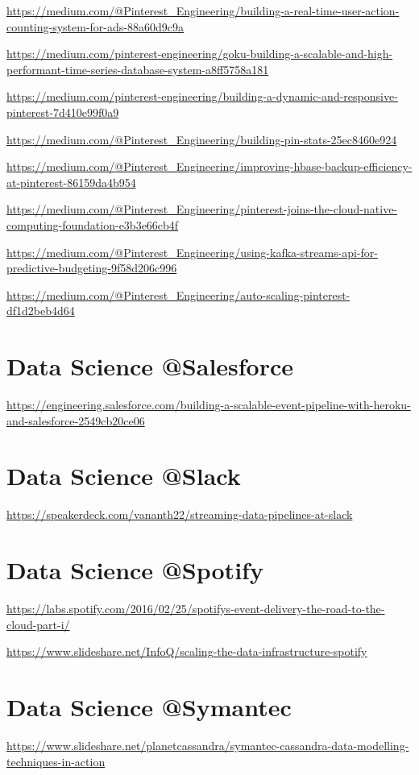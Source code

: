\documentclass[12pt, numbers=noenddot]{scrreprt} %
\begin{document}
\url{https://medium.com/@Pinterest_Engineering/building-a-real-time-user-action-counting-system-for-ads-88a60d9c9a}

\url{https://medium.com/pinterest-engineering/goku-building-a-scalable-and-high-performant-time-series-database-system-a8ff5758a181}

\url{https://medium.com/pinterest-engineering/building-a-dynamic-and-responsive-pinterest-7d410e99f0a9}

\url{https://medium.com/@Pinterest_Engineering/building-pin-stats-25ec8460e924}

\url{https://medium.com/@Pinterest_Engineering/improving-hbase-backup-efficiency-at-pinterest-86159da4b954}

\url{https://medium.com/@Pinterest_Engineering/pinterest-joins-the-cloud-native-computing-foundation-e3b3e66cb4f}

\url{https://medium.com/@Pinterest_Engineering/using-kafka-streams-api-for-predictive-budgeting-9f58d206c996}

\url{https://medium.com/@Pinterest_Engineering/auto-scaling-pinterest-df1d2beb4d64}

\section{Data Science @Salesforce}
\url{https://engineering.salesforce.com/building-a-scalable-event-pipeline-with-heroku-and-salesforce-2549cb20ce06}

\section{Data Science @Slack}
\url{https://speakerdeck.com/vananth22/streaming-data-pipelines-at-slack}

\section{Data Science @Spotify}
\url{https://labs.spotify.com/2016/02/25/spotifys-event-delivery-the-road-to-the-cloud-part-i/}

\url{https://www.slideshare.net/InfoQ/scaling-the-data-infrastructure-spotify}

\section{Data Science @Symantec}
\url{https://www.slideshare.net/planetcassandra/symantec-cassandra-data-modelling-techniques-in-action}
\end{document}
